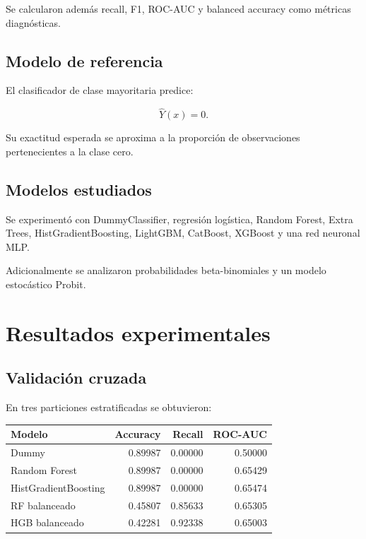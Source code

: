 ﻿\documentclass[11pt,a4paper]{article}
\begin{document}
Se calcularon además recall, F1, ROC-AUC y
balanced accuracy como métricas diagnósticas.

\subsection{Modelo de referencia}

El clasificador de clase mayoritaria predice:

\[
\widehat{Y}(x)=0.
\]

Su exactitud esperada se aproxima a la proporción
de observaciones pertenecientes a la clase cero.

\subsection{Modelos estudiados}

Se experimentó con DummyClassifier, regresión
logística, Random Forest, Extra Trees,
HistGradientBoosting, LightGBM, CatBoost,
XGBoost y una red neuronal MLP.

Adicionalmente se analizaron probabilidades
beta-binomiales y un modelo estocástico Probit.

\section{Resultados experimentales}

\subsection{Validación cruzada}

En tres particiones estratificadas se obtuvieron:

\begin{center}
\small
\begin{tabular}{lrrr}
\toprule
Modelo & Accuracy & Recall & ROC-AUC\\
\midrule
Dummy & 0.89987 & 0.00000 & 0.50000\\
Random Forest & 0.89987 & 0.00000 & 0.65429\\
HistGradientBoosting & 0.89987 & 0.00000 & 0.65474\\
RF balanceado & 0.45807 & 0.85633 & 0.65305\\
HGB balanceado & 0.42281 & 0.92338 & 0.65003\\
\bottomrule
\end{tabular}
\end{center}
\end{document}
